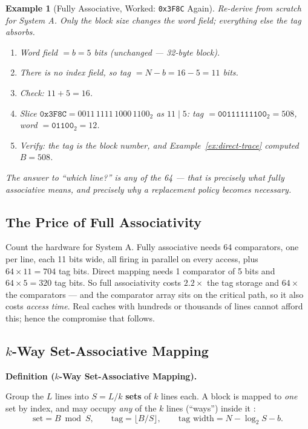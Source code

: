 \documentclass[11pt]{article}
\newtheorem{example}{Example}[section]
\newenvironment{definitionbox}[1]{%
  \par\noindent\textbf{Definition (#1).}\ \itshape
}{\par\vspace{0.3em}}
\begin{document}
\begin{example}[Fully Associative, Worked: \texttt{0x3F8C} Again]
\label{ex:fully-trace}
Re-derive from scratch for System A. Only the block size changes the word field; everything else the tag absorbs.

\begin{enumerate}
  \item Word field $= b = 5$ bits (unchanged --- 32-byte block).
  \item There is no index field, so tag $= N - b = 16 - 5 = 11$ bits.
  \item Check: $11 + 5 = 16$.
  \item Slice $\texttt{0x3F8C} = 0011\,1111\,1000\,1100_2$ as $11 \mid 5$: tag $= \texttt{00111111100}_2 = 508$, word $= \texttt{01100}_2 = 12$.
  \item Verify: the tag \emph{is} the block number, and Example~\ref{ex:direct-trace} computed $B = 508$.
\end{enumerate}

The answer to ``which line?'' is \emph{any of the 64} --- that is precisely what fully associative means, and precisely why a replacement policy becomes necessary.
\end{example}

\subsection{The Price of Full Associativity}

Count the hardware for System A. Fully associative needs 64 comparators, one per line, each 11 bits wide, all firing in parallel on every access, plus $64 \times 11 = 704$ tag bits. Direct mapping needs 1 comparator of 5 bits and $64 \times 5 = 320$ tag bits. So full associativity costs $2.2\times$ the tag storage and $64\times$ the comparators --- and the comparator array sits on the critical path, so it also costs \emph{access time}. Real caches with hundreds or thousands of lines cannot afford this; hence the compromise that follows.

\subsection{$k$-Way Set-Associative Mapping}
\label{sec:set-assoc}

\begin{definitionbox}{$k$-Way Set-Associative Mapping}
Group the $L$ lines into $S = L/k$ \textbf{sets} of $k$ lines each. A block is mapped to \emph{one} set by index, and may occupy \emph{any} of the $k$ lines (``ways'') inside it \cite[Fig.~5.13, PDF p.~200]{Stallings2015_computer_organization}:
\[
  \text{set} = B \bmod S, \qquad
  \text{tag} = \lfloor B / S \rfloor, \qquad
  \text{tag width} = N - \log_2 S - b .
\]
\end{definitionbox}
\end{document}
